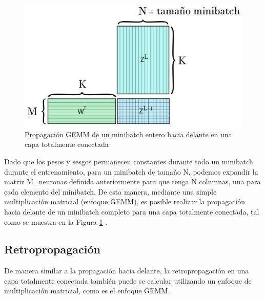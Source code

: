 \begin{figure}[H]
	\centering
	\includegraphics[scale=0.25]{imagenes/gemm_fully_forward_minibatch.jpg}  
	\caption{Propagación GEMM de un minibatch entero hacia delante en una capa totalmente conectada}
	\label{fig:gemm_fully_forward_minibatch}
\end{figure}

Dado que los pesos y sesgos permanecen constantes durante todo un minibatch durante el entrenamiento, para un minibatch de tamaño N, podemos expandir la matriz M\_neuronas definida anteriormente para que tenga N columnas, una para cada elemento del minibatch. De esta manera, mediante una simple multiplicación matricial (enfoque GEMM), es posible realizar la propagación hacia delante de un minibatch completo para una capa totalmente conectada, tal como se muestra en la Figura \ref{fig:gemm_fully_forward_minibatch} \cite{nvidia_back_fully_GEMM}.

\newpage

\subsection{Retropropagación}

De manera similar a la propagación hacia delante, la retropropagación en una capa totalmente conectada también puede se calcular utilizando un enfoque de multiplicación matricial, como es el enfoque GEMM.

